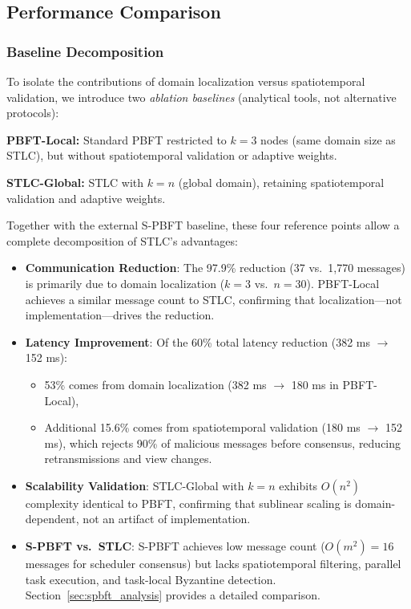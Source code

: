 \documentclass[manuscript,screen,review]{acmart}
\begin{document}
\subsection{Performance Comparison}
\label{sec:perf_comparison}

\subsubsection{Baseline Decomposition}
\label{sec:baseline_decomp}

To isolate the contributions of domain localization versus spatiotemporal validation, we introduce two \textit{ablation baselines} (analytical tools, not alternative protocols):

\textbf{PBFT-Local:} Standard PBFT restricted to $k = 3$ nodes (same domain size as STLC), but without spatiotemporal validation or adaptive weights.

\textbf{STLC-Global:} STLC with $k = n$ (global domain), retaining spatiotemporal validation and adaptive weights.

Together with the external S-PBFT baseline, these four reference points allow a complete decomposition of STLC's advantages:

\begin{itemize}
    \item \textbf{Communication Reduction}: The 97.9\% reduction (37 vs.\ 1,770 messages) is primarily due to domain localization ($k = 3$ vs.\ $n = 30$). PBFT-Local achieves a similar message count to STLC, confirming that localization---not implementation---drives the reduction.
    \item \textbf{Latency Improvement}: Of the 60\% total latency reduction (382 ms $\to$ 152 ms):
    \begin{itemize}
        \item 53\% comes from domain localization (382 ms $\to$ 180 ms in PBFT-Local),
        \item Additional 15.6\% comes from spatiotemporal validation (180 ms $\to$ 152 ms), which rejects 90\% of malicious messages before consensus, reducing retransmissions and view changes.
    \end{itemize}
    \item \textbf{Scalability Validation}: STLC-Global with $k = n$ exhibits $O(n^2)$ complexity identical to PBFT, confirming that sublinear scaling is domain-dependent, not an artifact of implementation.
    \item \textbf{S-PBFT vs.\ STLC}: S-PBFT achieves low message count ($O(m^2) = 16$ messages for scheduler consensus) but lacks spatiotemporal filtering, parallel task execution, and task-local Byzantine detection. Section~\ref{sec:spbft_analysis} provides a detailed comparison.
\end{itemize}
\end{document}
